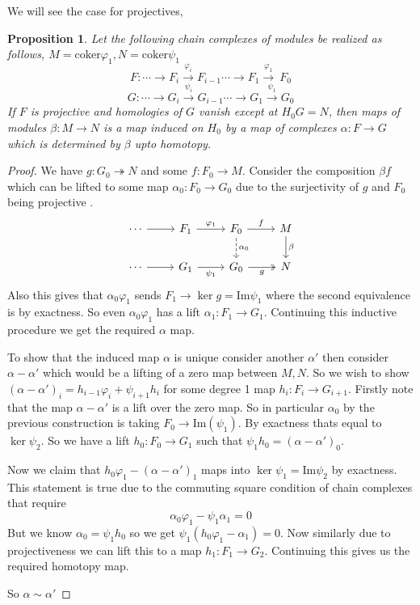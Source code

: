 \documentclass[12pt]{article}
\numberwithin{equation}{section}
\newcommand{\image}{{\mathrm{Im}}}
\newtheorem{proposition}{Proposition}[section]
\begin{document}
	We will see the case for projectives,
	\begin{proposition}
		Let the following chain complexes of modules be realized as follows, $M = \mathrm{coker } \varphi_1, N = \mathrm{coker } \psi _1$
		\[ F: \cdots \to F_i \xrightarrow{\varphi_i}  F_{i-1} \cdots \to F_1 \xrightarrow{\varphi_1} \ F_0\]
		\[ G: \cdots \to G_i \xrightarrow{\psi_i}  G_{i-1} \cdots \to G_1 \xrightarrow{\psi_1}  G_0  \]
		If $F$ is projective and homologies of $G$ vanish except at $H_0G=N$, then maps of modules $\beta : M \to N	$ is a map induced on $H_0$ by a map of complexes $\alpha: F \to G$ which is determined by $\beta $ upto homotopy.
	\end{proposition}
	\begin{proof}
		We have $g: G_0 \twoheadrightarrow N$ and some $f: F_0 \to M$. Consider the composition $\beta f$ which can be lifted to some map $\alpha_0 : F_0 \to G_0$ due to the surjectivity of $g$ and $F_0$ being projective	. 
		\[\begin{tikzcd}
			\cdots & {F_1} & {F_0} & M \\
			\cdots & {G_1} & {G_0} & N
			\arrow["g"', two heads, from=2-3, to=2-4]
			\arrow["\beta", from=1-4, to=2-4]
			\arrow["f", from=1-3, to=1-4]
			\arrow["{\varphi_1}", from=1-2, to=1-3]
			\arrow["{\psi_1}"', from=2-2, to=2-3]
			\arrow["{\alpha_0}", dashed, from=1-3, to=2-3]
			\arrow[from=1-1, to=1-2]
			\arrow[from=2-1, to=2-2]
		\end{tikzcd}\]
		Also this gives that $\alpha_0 \varphi_1$ sends $F_1 \to \ker g = \image \psi_1$ where the second equivalence is by exactness. So even $\alpha_0 \varphi_1 $ has a lift $\alpha_1 : F_1 \to G_1$. Continuing this inductive procedure we get the required $\alpha $ map.
		
		To show that the induced map $\alpha $ is unique consider another $\alpha' $ then consider $\alpha-\alpha'$ which would be a lifting of a zero map between $M,N$. So we wish to show $(\alpha-\alpha')_i=h_{i-1}\varphi_i +\psi_{i+1}h_i$ for some degree 1 map $h_i: F_i \to G_{i+1}$. Firstly note that the map $\alpha-\alpha'$ is a lift over the zero map. So in particular $\alpha_0 $ by the previous construction is taking $F_0 \to \image(\psi_1)$. By exactness thats equal to $\ker \psi_2$. So we have a lift $h_0: F_0 \to G_1$ such that $\psi_1 h_0=(\alpha-\alpha')_0$.
		
		Now we claim that $h_0\varphi_1 - (\alpha-\alpha')_1 $ maps into $\ker \psi_1=\image \psi_2 $ by exactness. This statement is true due to the commuting square condition of chain complexes that require $$\alpha_0 \varphi_1-\psi_1\alpha_1=0	$$ But we know $\alpha_0=\psi_1 h_0$ so we get $\psi_1(h_0\varphi_1 - \alpha_1)=0$. Now similarly due to projectiveness we can lift this to a map $h_1: F_1 \to G_2$. Continuing this gives us the required homotopy map.
		
		So $\alpha\sim \alpha'$
	\end{proof}
	
\end{document}
